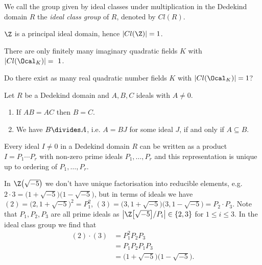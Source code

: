 \begin{defn*}
	We call the group given by ideal classes under multiplication in the Dedekind domain \( R \) the \emph{ideal class group} of \( R \), denoted by \( Cl(R) \).
\end{defn*}

\begin{exmp*}
	\( \Z \) is a principal ideal domain, hence \( |Cl(\Z)| = 1 \).
\end{exmp*}

\begin{rem*}
	There are only finitely many imaginary quadratic fields \( K \) with \( |Cl(\Ocal_K)| =~1 \).
\end{rem*}

\begin{frage*}[Gauss]
	Do there exist as many real quadratic number fields \( K \) with \( |Cl(\Ocal_K)| = 1 \)?
\end{frage*}

\begin{cor}
	Let \( R \) be a Dedekind domain and \( A,B,C \) ideals with \( A \neq 0 \).
	\begin{enumerate}
		\item If \( AB = AC \) then \( B=C \).
		\item We have \( B \divides A \), i.e. \( A = BJ \) for some ideal \( J \), if and only if \( A \subseteq B \).
	\end{enumerate}
\end{cor}

\begin{thmn}
	Every ideal \( I \neq 0 \) in a Dedekind domain \( R \) can be written as a product \( I = P_1 \dotsm P_r \) with non-zero prime ideals \( P_1, \dotsc, P_r \) and this representation is unique up to ordering of \( P_1, \dotsc, P_r \).
\end{thmn}

\begin{exmp*}
	In \( \Z\big(\sqrt{-5}\big) \) we don't have unique factorisation into reducible elements, e.g. \( 2 \cdot 3 = \big(1+\sqrt{-5}\big) \big(1 - \sqrt{-5}\big) \), but in terms of ideals we have \( (2) = \big(2, 1+\sqrt{-5}\big)^2 = P_1^2 \), \( (3) = \big(3, 1 + \sqrt{-5}\big) \big(3, 1 - \sqrt{-5}\big) = P_2 \cdot P_3 \). 
	Note that \( P_1, P_2, P_3 \) are all prime ideals as \( \left| \Z\big[\sqrt{-5}\big]/P_i \right| \in \{2,3\}  \) for \( 1 \leq i \leq 3 \). In the ideal class group we find that
	\begin{align*}
		(2)\cdot (3) &= P_1^2 P_2 P_3\\
		&= P_1 P_2 P_1 P_3\\
		&= \big(1 + \sqrt{-5}\big) \big(1 - \sqrt{-5}\big).
	\end{align*}
\end{exmp*}

